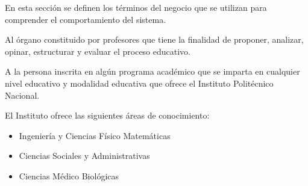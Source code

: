 En esta sección se definen los términos del negocio que se utilizan para comprender el comportamiento del sistema.

\begin{bGlosario}	
	
	 Al órgano constituido por profesores que tiene la finalidad de proponer, analizar, opinar, estructurar y evaluar el proceso educativo.
	
	 A la persona inscrita en algún programa académico que se imparta en cualquier nivel educativo y modalidad educativa que ofrece el Instituto Politécnico Nacional. %
	
	 El Instituto ofrece las siguientes áreas de conocimiento:
	\begin{itemize}
		\item Ingeniería y Ciencias Físico Matemáticas
		\item Ciencias Sociales y Administrativas
		\item Ciencias Médico Biológicas
	\end{itemize}


\end{bGlosario}
